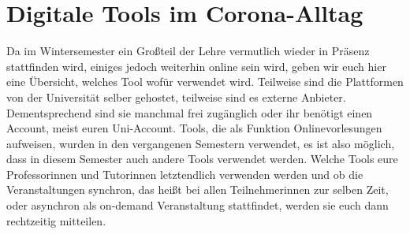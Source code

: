 \section{Digitale Tools im Corona-Alltag}

Da im Wintersemester ein Großteil der Lehre vermutlich wieder in Präsenz stattfinden wird, einiges jedoch weiterhin online sein wird, geben wir euch hier eine Übersicht, welches Tool wofür verwendet wird. Teilweise sind die Plattformen von der Universität selber gehostet, teilweise sind es externe Anbieter. Dementsprechend sind sie manchmal frei zugänglich oder ihr benötigt einen Account, meist euren Uni-Account. Tools, die als Funktion Onlinevorlesungen aufweisen, wurden in den vergangenen Semestern verwendet, es ist also möglich, dass in diesem Semester auch andere Tools verwendet werden. Welche Tools eure Professorinnen und Tutorinnen letztendlich verwenden werden und ob die Veranstaltungen synchron, das heißt bei allen Teilnehmerinnen zur selben Zeit, oder asynchron als on-demand Veranstaltung stattfindet, werden sie euch dann rechtzeitig mitteilen.

